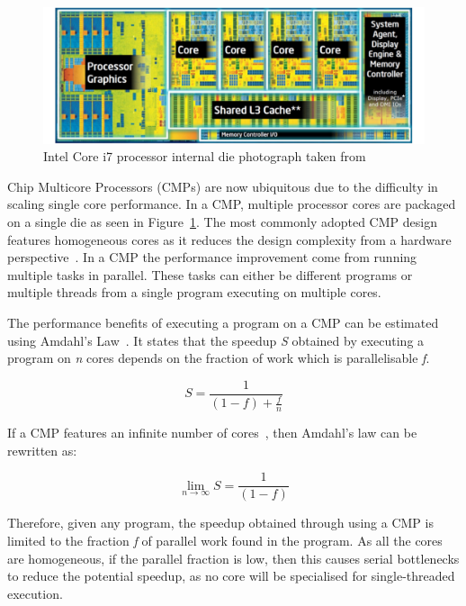 \begin{figure}[t]
 \center
 \includegraphics[width=1\textwidth]{background/graphics/i7intel.pdf}
 \caption{Intel Core i7 processor internal die photograph taken from~\cite{turleywhite}}\label{fig:i7}
\end{figure}
 
Chip Multicore Processors (CMPs) are now ubiquitous due to the difficulty in scaling single core performance.
In a CMP, multiple processor cores are packaged on a single die as seen in Figure~\ref{fig:i7}.
The most commonly adopted CMP design features homogeneous cores as it reduces the design complexity from a hardware perspective~\cite{asanovic2006landscape}.
In a CMP the performance improvement come from running multiple tasks in parallel.
These tasks can either be different programs or multiple threads from a single program executing on multiple cores.

The performance benefits of executing a program on a CMP can be estimated using Amdahl's Law~\cite{amdahl1967validity}.
It states that the speedup \textit{S} obtained by executing a program on \textit{n} cores depends on the fraction of work which is parallelisable \textit{f}.

\begin{equation}
S = \frac{1}{(1-f) + \frac{f}{n}}
\end{equation}\label{amdlaw}

If a CMP features an infinite number of cores~\cite{eyerman2010amdahl}, then Amdahl's law can be rewritten as:

\begin{equation}
\lim_{n\to\infty} S = \frac{1}{(1-f)}
\end{equation}

Therefore, given any program, the speedup obtained through using a CMP is limited to the fraction \textit{f} of parallel work found in the program.
As all the cores are homogeneous, if the parallel fraction is low, then this causes serial bottlenecks to reduce the potential speedup, as no core will be specialised for single-threaded execution.
